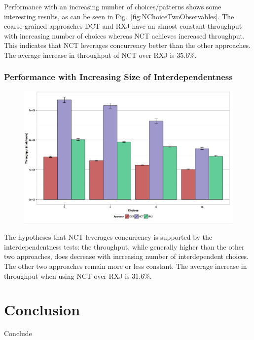 \documentclass[runningheads]{llncs}
\begin{document}
\begin{sloppypar}
Performance with an increasing number of choices/patterns shows some
interesting results, as can be seen in Fig.~\ref{fig:NChoiceTwoObservables}.
The coarse-grained approaches DCT and RXJ have an almost constant throughput
with increasing number of choices whereas NCT achieves increased throughput.
This indicates that NCT leverages concurrency better than the other
approaches. The average increase in throughput of NCT over RXJ is 35.6\%.

\subsubsection{Performance with Increasing Size of Interdependentness}

\begin{figure}[h]
  \centering
  \includegraphics[scale=0.30]{img/32-patterns-N-interdep.pdf}
  \caption{}
  \label{fig:}
\end{figure}

The hypotheses that NCT leverages concurrency is supported by the
interdependentness tests: the throughput, while generally higher than the
other two approaches, does decrease with increasing number of interdependent
choices. The other two approaches remain more or less constant. The average
increase in throughput when using NCT over RXJ is 31.6\%.



\section{Conclusion}\label{sec:conclusion}

Conclude




\end{sloppypar}
\end{document}
